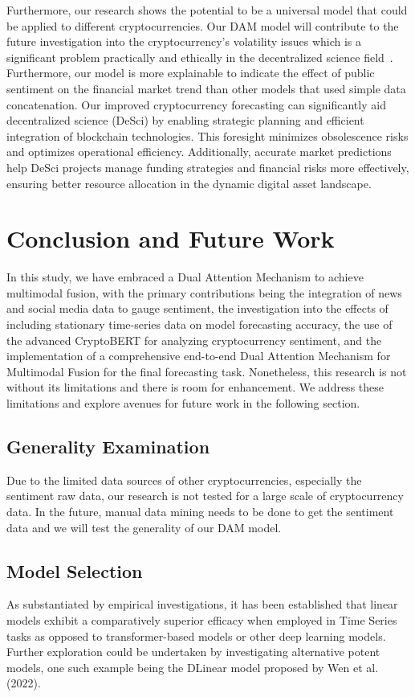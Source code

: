 Furthermore, our research shows the potential to be a universal model that could be applied to different cryptocurrencies. Our DAM model will contribute to the future investigation into the cryptocurrency's volatility issues which is a significant problem practically and ethically in the decentralized science field~\cite{kshetri2022policy,ding2022desci}. Furthermore, our model is more explainable to indicate the effect of public sentiment on the financial market trend than other models that used simple data concatenation. Our improved cryptocurrency forecasting can significantly aid decentralized science (DeSci) by enabling strategic planning and efficient integration of blockchain technologies. This foresight minimizes obsolescence risks and optimizes operational efficiency. Additionally, accurate market predictions help DeSci projects manage funding strategies and financial risks more effectively, ensuring better resource allocation in the dynamic digital asset landscape.

\section{Conclusion and Future Work}
\label{conclusion and future work}
In this study, we have embraced a Dual Attention Mechanism to achieve multimodal fusion, with the primary contributions being the integration of news and social media data to gauge sentiment, the investigation into the effects of including stationary time-series data on model forecasting accuracy, the use of the advanced CryptoBERT for analyzing cryptocurrency sentiment, and the implementation of a comprehensive end-to-end Dual Attention Mechanism for Multimodal Fusion for the final forecasting task. Nonetheless, this research is not without its limitations and there is room for enhancement. We address these limitations and explore avenues for future work in the following section.
\subsection{Generality Examination}
Due to the limited data sources of other cryptocurrencies, especially the sentiment raw data, our research is not tested for a large scale of cryptocurrency data. In the future, manual data mining needs to be done to get the sentiment data and we will test the generality of our DAM model. 
\subsection{Model Selection}
As substantiated by empirical investigations, it has been established that linear models exhibit a comparatively superior efficacy when employed in Time Series tasks as opposed to transformer-based models or other deep learning models. Further exploration could be undertaken by investigating alternative potent models, one such example being the DLinear model proposed by Wen et al. (2022)\cite{wen2022transformers}.

